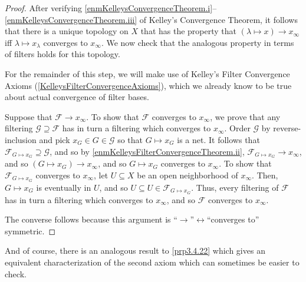\begin{thm}
\begin{proof}
After verifying \ref{enmKelleysConvergenceTheorem.i}--\ref{enmKelleysConvergenceTheorem.iii} of Kelley's Convergence Theorem, it follows that there is a unique topology on $X$ that has the property that $(\lambda \mapsto x )\to x_\infty$ iff $\lambda \mapsto x_\lambda$ converges to $x_\infty$.  We now check that the analogous property in terms of filters holds for this topology.

For the remainder of this step, we will make use of Kelley's Filter Convergence Axioms (\cref{KelleysFilterConvergenceAxioms}), which we already know to be true about actual convergence of filter bases.

Suppose that $\mathcal{F}\to x_\infty$.  To show that $\mathcal{F}$ converges to $x_\infty$, we prove that any filtering $\mathcal{G}\supseteq \mathcal{F}$ has in turn a filtering which converges to $x_\infty$.  Order $\mathcal{G}$ by reverse-inclusion and pick $x_G\in G\in \mathcal{G}$ so that $G\mapsto x_G$ is a net.  It follows that $\mathcal{F}_{G\mapsto x_G}\supseteq \mathcal{G}$, and so by \ref{enmKelleysFilterConvergenceTheorem.ii}, $\mathcal{F}_{G\mapsto x_G}\to x_\infty$, and so $(G\mapsto x_G)\to x_\infty$, and so $G\mapsto x_G$ converges to $x_\infty$.  To show that $\mathcal{F}_{G\mapsto x_G}$ converges to $x_\infty$, let $U\subseteq X$ be an open neighborhood of $x_\infty$.  Then, $G\mapsto x_G$ is eventually in $U$, and so $U\subseteq U\in \mathcal{F}_{G\mapsto x_G}$.  Thus, every filtering of $\mathcal{F}$ has in turn a filtering which converges to $x_\infty$, and so $\mathcal{F}$ converges to $x_\infty$.

The converse follows because this argument is ``$\to$''$\leftrightarrow$``converges to'' symmetric.
\end{proof}
\end{thm}
And of course, there is an analogous result to \cref{prp3.4.22} which gives an equivalent characterization of the second axiom which can sometimes be easier to check.
